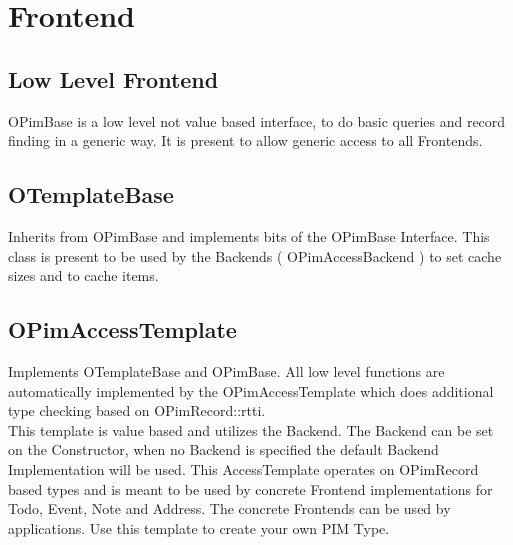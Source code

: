 \section{Frontend}

\subsection{Low Level Frontend}
OPimBase is a low level not value based interface, to do basic queries
and record finding in a generic way. It is present to allow
generic access to all Frontends.

\subsection{OTemplateBase}
Inherits from OPimBase and implements bits of the OPimBase Interface.
This class is present to be used by the Backends ( OPimAccessBackend )
to set cache sizes and to cache items.

\subsection{OPimAccessTemplate}
Implements OTemplateBase and OPimBase. All low level functions are
automatically implemented by the OPimAccessTemplate which does
additional type checking based on OPimRecord::rtti.\\
This template is value based and utilizes the Backend. The Backend
can be set on the Constructor, when no Backend is specified
the default Backend Implementation will be used.
This AccessTemplate operates on OPimRecord based types and is meant
to be used by concrete Frontend implementations for Todo, Event,
Note and Address. The concrete Frontends can be used by applications.
Use this template to create your own PIM Type.

